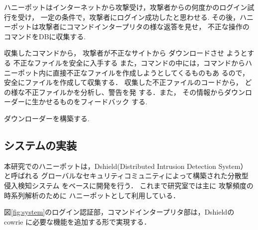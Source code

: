 \documentclass{entry}
\begin{document}
ハニーポットはインターネットから攻撃受け，攻撃者からの何度かのログイン試行を受け，
一定の条件で，攻撃者にログイン成功したと思わせる.
その後，ハニーポットは攻撃者にコマンドインタープリタの様な返答を見せ，
不正な操作のコマンドをDBに収集する.

収集したコマンドから，
攻撃者が不正なサイトから
ダウンロードさせ
ようとする
不正なファイルを安全に入手する
また，コマンドの中には，コマンドからハニーポット内に直接不正なファイルを作成しようとしてくるものもあ
るので，安全にファイルを作成して収集する．
収集した不正ファイルのコードから，
どの様な不正ファイルかを分析し、警告を発
する．また，
その情報からダウンローダーに生かせるものをフィードバック
する.

ダウンローダーを構築する.



\subsection{システムの実装}

本研究でのハニーポットは，Dshield(Distributed Intrusion Detection System）
と呼ばれる
グローバルなセキュリティコミュニティによって構築された分散型侵入検知システム
をベースに開発を行う．
これまで研究室では主に
攻撃頻度の時系列解析のために
ハニーポットとして利用している\cite{nishida2022}．

図\ref{fig:system}のログイン認証部，コマンドインタープリタ部は，Dshieldの
cowrie に必要な機能を追加する形で実現する．
\end{document}
